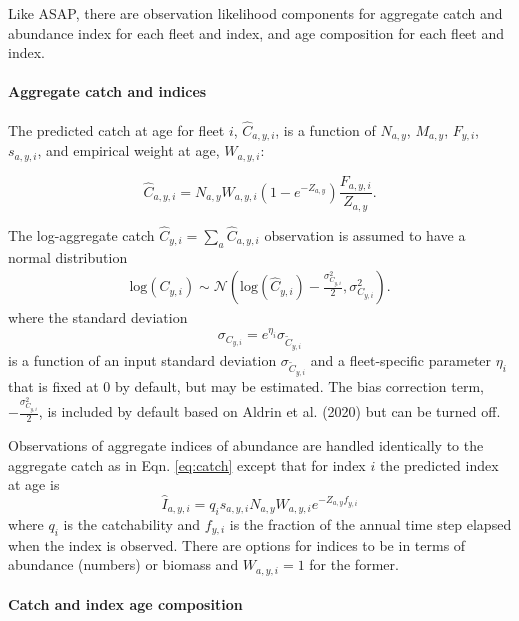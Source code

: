 \documentclass[]{article}
\let\oldparagraph\paragraph
\renewcommand{\paragraph}[1]{\oldparagraph{#1}\mbox{}}
\begin{document}
Like ASAP, there are observation likelihood components for aggregate
catch and abundance index for each fleet and index, and age composition
for each fleet and index.

\hypertarget{aggregate-catch-and-indices}{%
\paragraph{Aggregate catch and
indices}\label{aggregate-catch-and-indices}}

The predicted catch at age for fleet \(i\), \(\hat{C}_{a,y,i}\), is a
function of \(N_{a,y}\), \(M_{a,y}\), \(F_{y,i}\), \(s_{a,y,i}\), and
empirical weight at age, \(W_{a,y,i}\):

\[
\hat{C}_{a,y,i} = N_{a,y} W_{a,y,i}\left(1- e^{-Z_{a,y}}\right)\frac{F_{a,y,i}}{Z_{a,y}}.
\]

The log-aggregate catch \(\hat{C}_{y,i} = \sum_a \hat{C}_{a,y,i}\)
observation is assumed to have a normal distribution \begin{equation}
\label{eq:catch}
  \begin{array}{ccc}
    \text{log}(C_{y,i}) \sim \mathcal{N}\left( \text{log}(\hat{C}_{y,i}) - \frac{\sigma^2_{C_{y,i}}}{2}, \sigma^2_{C_{y,i}}\right).
  \end{array}
\end{equation} where the standard deviation \[
\sigma_{C_{y,i}} = e^{\eta_i}\sigma_{\tilde{C}_{y,i}}
\] is a function of an input standard deviation
\(\sigma_{\tilde{C}_{y,i}}\) and a fleet-specific parameter \(\eta_i\)
that is fixed at 0 by default, but may be estimated. The bias correction
term, \(- \frac{\sigma^2_{C_{y,i}}}{2}\), is included by default based
on Aldrin et al. (2020) but can be turned off.

Observations of aggregate indices of abundance are handled identically
to the aggregate catch as in Eqn. \ref{eq:catch} except that for index
\(i\) the predicted index at age is
\[\hat{I}_{a,y,i} = q_i s_{a,y,i} N_{a,y}W_{a,y,i} e^{-Z_{a,y}f_{y,i}}\]
where \(q_i\) is the catchability and \(f_{y,i}\) is the fraction of the
annual time step elapsed when the index is observed. There are options
for indices to be in terms of abundance (numbers) or biomass and
\(W_{a,y,i} = 1\) for the former.

\hypertarget{catch-and-index-age-composition}{%
\paragraph{Catch and index age
composition}\label{catch-and-index-age-composition}}
\end{document}
